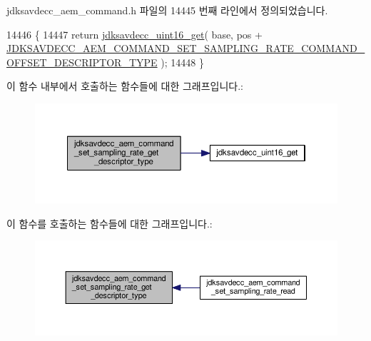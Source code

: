 jdksavdecc\+\_\+aem\+\_\+command.\+h 파일의 14445 번째 라인에서 정의되었습니다.


\begin{DoxyCode}
14446 \{
14447     \textcolor{keywordflow}{return} \hyperlink{group__endian_ga3fbbbc20be954aa61e039872965b0dc9}{jdksavdecc\_uint16\_get}( base, pos + 
      \hyperlink{group__command__set__sampling__rate_gabcd1b26cb4dd9ca2c4f0dfaa7c8aba35}{JDKSAVDECC\_AEM\_COMMAND\_SET\_SAMPLING\_RATE\_COMMAND\_OFFSET\_DESCRIPTOR\_TYPE}
       );
14448 \}
\end{DoxyCode}


이 함수 내부에서 호출하는 함수들에 대한 그래프입니다.\+:
\nopagebreak
\begin{figure}[H]
\begin{center}
\leavevmode
\includegraphics[width=350pt]{group__command__set__sampling__rate_ga70f52702768e7e48c4c2ef2434e41ff2_cgraph}
\end{center}
\end{figure}




이 함수를 호출하는 함수들에 대한 그래프입니다.\+:
\nopagebreak
\begin{figure}[H]
\begin{center}
\leavevmode
\includegraphics[width=350pt]{group__command__set__sampling__rate_ga70f52702768e7e48c4c2ef2434e41ff2_icgraph}
\end{center}
\end{figure}


